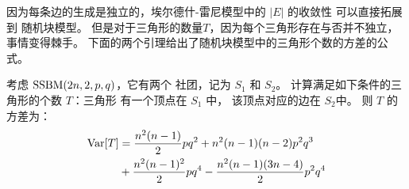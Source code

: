 因为每条边的生成是独立的，埃尔德什-雷尼模型中的
$|E|$ 的收敛性
可以直接拓展到
随机块模型。
但是对于三角形的数量$T$，因为每个三角形存在与否并不独立，事情变得棘手。
下面的两个引理给出了随机块模型中的三角形个数的方差的公式。
\begin{lemma}\label{lem:SBM_tr_counting_cross}
	考虑 $\operatorname{SSBM}(2n, 2, p, q)$，它有两个
  社团，记为 $S_1$ 和 $S_2$。
    计算满足如下条件的三角形的个数 $T$：三角形
    有一个顶点在  $S_1$ 中，
    该顶点对应的边在 $S_2$中。
   则 $T$ 的方差为：
\begin{align}
\operatorname{\mathrm{Var}}[T]  &= \frac{n^2(n-1)}{2}pq^2 + n^2(n-1)(n-2)p^2q^3 \notag \\
  &\relax + \frac{n^2(n-1)^2}{2}pq^4 - \frac{n^2(n-1)(3n-4)}{2} p^2 q^4
 \label{eq:SBM_tr_counting_cross}
\end{align}
\end{lemma}
